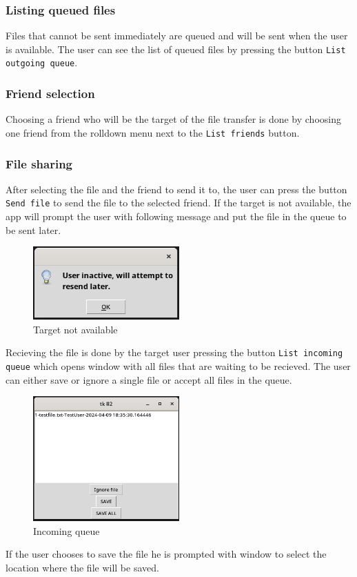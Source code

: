 \subsubsection{Listing queued files}
Files that cannot be sent immediately are queued and will be sent when the user is available. The user can see the list of queued files by pressing the button 
\texttt{List outgoing queue}.\\

\subsubsection{Friend selection}
Choosing a friend who will be the target of the file transfer is done by choosing one friend from the rolldown menu next to the \texttt{List friends} button.\\

\subsubsection{File sharing}
After selecting the file and the friend to send it to, the user can press the button \texttt{Send file} to send the file to the selected friend.
If the target is not available, the app will prompt the user with following message and put the file in the queue to be sent later.
\begin{figure}[h]
    \centering
    \includegraphics[width=0.5\textwidth]{images/notAvailable.png}
    \caption{Target not available}
    \label{fig:notAvail}
\end{figure}

Recieving the file is done by the target user pressing the button \texttt{List incoming queue} which opens window with all files that are waiting to be
recieved. The user can either save or ignore a single file or accept all files in the queue.\\

\begin{figure}[ht]
    \centering
    \includegraphics[width=0.5\textwidth]{images/queue.png}
    \caption{Incoming queue}
    \label{fig:inQueue}
\end{figure}

If the user chooses to save the file he is prompted with window to select the location where the file will be saved.\\